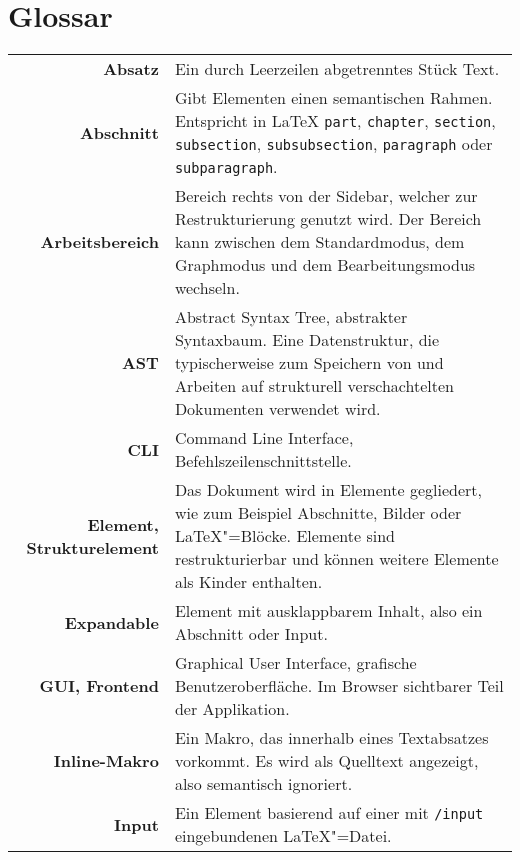 \clearpage

\section{Glossar}
\label{sec:glossar}
\setlength{\extrarowheight}{2em}

\begin{longtable}
{>{\bfseries}rp{9cm}}
  Absatz &
  Ein durch Leerzeilen abgetrenntes Stück Text. \\

  Abschnitt &
  Gibt Elementen einen semantischen Rahmen.
  Entspricht in \LaTeX{} \verb|part|, \verb|chapter|, \verb|section|, \verb|subsection|, \verb|subsubsection|,
  \verb|paragraph| oder \verb|subparagraph|. \\

  Arbeitsbereich &
  Bereich rechts von der Sidebar, welcher zur Restrukturierung genutzt wird.
  Der Bereich kann zwischen dem Standardmodus, dem Graphmodus und dem Bearbeitungsmodus wechseln. \\

  AST &
  Abstract Syntax Tree, abstrakter Syntaxbaum.
  Eine Datenstruktur, die typischerweise zum Speichern von und Arbeiten auf strukturell verschachtelten Dokumenten
  verwendet wird. \\

  CLI &
  Command Line Interface, Befehlszeilenschnittstelle. \\

  Element, Strukturelement &
  Das Dokument wird in Elemente gegliedert, wie zum Beispiel Abschnitte, Bilder oder \LaTeX"=Blöcke.
  Elemente sind restrukturierbar und können weitere Elemente als Kinder enthalten. \\

  Expandable &
  Element mit ausklappbarem Inhalt, also ein Abschnitt oder Input. \\

  GUI, Frontend &
  Graphical User Interface, grafische Benutzeroberfläche.
  Im Browser sichtbarer Teil der Applikation. \\

  Inline-Makro &
  Ein Makro, das innerhalb eines Textabsatzes vorkommt.
  Es wird als Quelltext angezeigt, also semantisch ignoriert. \\

  Input &
  Ein Element basierend auf einer mit \verb|/input| eingebundenen \LaTeX"=Datei. \\


\end{longtable}
